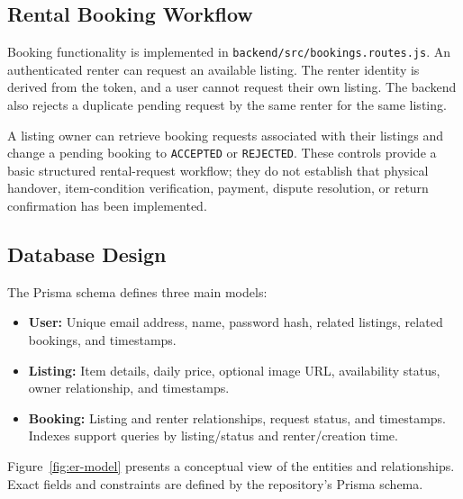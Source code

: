 \documentclass{tietreport}
\begin{document}
\subsection{Rental Booking Workflow}
Booking functionality is implemented in \texttt{backend/src/bookings.routes.js}. An authenticated renter can request an available listing. The renter identity is derived from the token, and a user cannot request their own listing. The backend also rejects a duplicate pending request by the same renter for the same listing.

A listing owner can retrieve booking requests associated with their listings and change a pending booking to \texttt{ACCEPTED} or \texttt{REJECTED}. These controls provide a basic structured rental-request workflow; they do not establish that physical handover, item-condition verification, payment, dispute resolution, or return confirmation has been implemented.

\subsection{Database Design}
The Prisma schema defines three main models:
\begin{itemize}
  \item \textbf{User:} Unique email address, name, password hash, related listings, related bookings, and timestamps.
  \item \textbf{Listing:} Item details, daily price, optional image URL, availability status, owner relationship, and timestamps.
  \item \textbf{Booking:} Listing and renter relationships, request status, and timestamps. Indexes support queries by listing/status and renter/creation time.
\end{itemize}

Figure~\ref{fig:er-model} presents a conceptual view of the entities and relationships. Exact fields and constraints are defined by the repository's Prisma schema.
\end{document}
